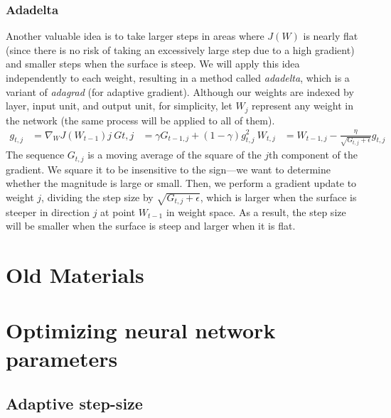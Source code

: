 \subsubsection{Adadelta}
Another valuable idea is to take larger steps in areas where $J(W)$ is nearly flat (since there is no risk of taking an excessively large step due to a high gradient) and smaller steps when the surface is steep. We will apply this idea independently to each weight, resulting in a method called \textit{adadelta}, which is a variant of \textit{adagrad} (for adaptive gradient). Although our weights are indexed by layer, input unit, and output unit, for simplicity, let $W_j$ represent any weight in the network (the same process will be applied to all of them).
\begin{align*}
g_{t,j} & = \nabla_W J(W_{t-1})j \
G{t,j} & = \gamma G_{t - 1,j} + (1 - \gamma)g_{t,j}^2 \
W_{t,j} & = W_{t-1, j} - \frac{\eta}{\sqrt{G_{t,j} + \epsilon}}g_{t,j}
\end{align*}
The sequence $G_{t,j}$ is a moving average of the square of the $j$th component of the gradient. We square it to be insensitive to the sign—we want to determine whether the magnitude is large or small. Then, we perform a gradient update to weight $j$, dividing the step size by $\sqrt{G_{t,j} + \epsilon}$, which is larger when the surface is steeper in direction $j$ at point $W_{t-1}$ in weight space. As a result, the step size will be smaller when the surface is steep and larger when it is flat.

\section{Old Materials}

\section{Optimizing neural network parameters}
\label{sec:make_nn_work}




\subsection{Adaptive step-size}



